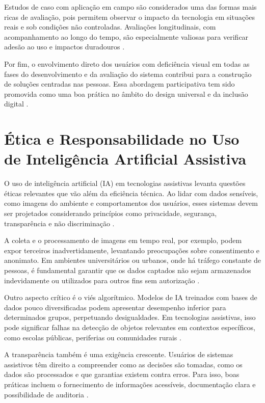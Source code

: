 Estudos de caso com aplicação em campo são considerados uma das formas mais ricas de avaliação, pois permitem observar o impacto da tecnologia em situações reais e sob condições não controladas. Avaliações longitudinais, com acompanhamento ao longo do tempo, são especialmente valiosas para verificar adesão ao uso e impactos duradouros \cite{Batavia1990}.

Por fim, o envolvimento direto dos usuários com deficiência visual em todas as fases do desenvolvimento e da avaliação do sistema contribui para a construção de soluções centradas nas pessoas. Essa abordagem participativa tem sido promovida como uma boa prática no âmbito do design universal e da inclusão digital \cite{Story1998}.

\section{\textbf{Ética e Responsabilidade no Uso de Inteligência Artificial Assistiva}}

O uso de inteligência artificial (IA) em tecnologias assistivas levanta questões éticas relevantes que vão além da eficiência técnica. Ao lidar com dados sensíveis, como imagens do ambiente e comportamentos dos usuários, esses sistemas devem ser projetados considerando princípios como privacidade, segurança, transparência e não discriminação \cite{Floridi2018}.

A coleta e o processamento de imagens em tempo real, por exemplo, podem expor terceiros inadvertidamente, levantando preocupações sobre consentimento e anonimato. Em ambientes universitários ou urbanos, onde há tráfego constante de pessoas, é fundamental garantir que os dados captados não sejam armazenados indevidamente ou utilizados para outros fins sem autorização \cite{Jobin2019}.

Outro aspecto crítico é o viés algorítmico. Modelos de IA treinados com bases de dados pouco diversificadas podem apresentar desempenho inferior para determinados grupos, perpetuando desigualdades. Em tecnologias assistivas, isso pode significar falhas na detecção de objetos relevantes em contextos específicos, como escolas públicas, periferias ou comunidades rurais \cite{Buolamwini2018}.

A transparência também é uma exigência crescente. Usuários de sistemas assistivos têm direito a compreender como as decisões são tomadas, como os dados são processados e que garantias existem contra erros. Para isso, boas práticas incluem o fornecimento de informações acessíveis, documentação clara e possibilidade de auditoria \cite{Morley2020}.

